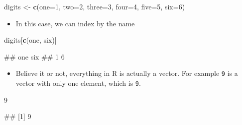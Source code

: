 \documentclass[
]{book}
\newenvironment{Shaded}{\begin{snugshade}}{\end{snugshade}}
\newcommand{\DecValTok}[1]{\textcolor[rgb]{0.00,0.00,0.81}{#1}}
\newcommand{\FunctionTok}[1]{\textcolor[rgb]{0.13,0.29,0.53}{\textbf{#1}}}
\newcommand{\NormalTok}[1]{#1}
\newcommand{\OtherTok}[1]{\textcolor[rgb]{0.56,0.35,0.01}{#1}}
\newcommand{\StringTok}[1]{\textcolor[rgb]{0.31,0.60,0.02}{#1}}
\providecommand{\tightlist}{%
  \setlength{\itemsep}{0pt}\setlength{\parskip}{0pt}}
\begin{document}
\begin{Shaded}
\begin{Highlighting}[]
\NormalTok{digits }\OtherTok{\textless{}{-}} \FunctionTok{c}\NormalTok{(}\StringTok{\textquotesingle{}one\textquotesingle{}}\OtherTok{=}\DecValTok{1}\NormalTok{, }\StringTok{\textquotesingle{}two\textquotesingle{}}\OtherTok{=}\DecValTok{2}\NormalTok{, }\StringTok{\textquotesingle{}three\textquotesingle{}}\OtherTok{=}\DecValTok{3}\NormalTok{, }\StringTok{\textquotesingle{}four\textquotesingle{}}\OtherTok{=}\DecValTok{4}\NormalTok{, }\StringTok{\textquotesingle{}five\textquotesingle{}}\OtherTok{=}\DecValTok{5}\NormalTok{, }\StringTok{\textquotesingle{}six\textquotesingle{}}\OtherTok{=}\DecValTok{6}\NormalTok{)}
\end{Highlighting}
\end{Shaded}

\begin{itemize}
\tightlist
\item
  In this case, we can index by the name
\end{itemize}

\begin{Shaded}
\begin{Highlighting}[]
\NormalTok{digits[}\FunctionTok{c}\NormalTok{(}\StringTok{\textquotesingle{}one\textquotesingle{}}\NormalTok{, }\StringTok{\textquotesingle{}six\textquotesingle{}}\NormalTok{)]}
\end{Highlighting}
\end{Shaded}

\begin{Shaded}
\begin{Highlighting}[]
\NormalTok{\#\# one six }
\NormalTok{\#\#   1   6}
\end{Highlighting}
\end{Shaded}

\begin{itemize}
\tightlist
\item
  Believe it or not, everything in R is actually a vector. For example \texttt{9} is a vector with only one element, which is \texttt{9}.
\end{itemize}

\begin{Shaded}
\begin{Highlighting}[]
\DecValTok{9}
\end{Highlighting}
\end{Shaded}

\begin{Shaded}
\begin{Highlighting}[]
\NormalTok{\#\# [1] 9}
\end{Highlighting}
\end{Shaded}
\end{document}
